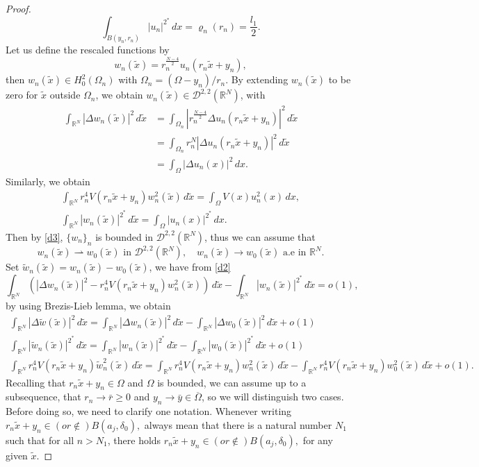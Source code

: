 \documentclass[reqno]{amsart}
\begin{document}
\begin{proof}
 \[
 \int _{B(y_n, r_n)}|u_n|^{2^*}\,dx=\varrho_n(r_n)=\frac{l_1}{2}.
 \]
 Let us define the rescaled functions by
\[
 w_n(\tilde{x})=r_n^{\frac{N-4}{2}}u_n(r_n\tilde{x}+y_n),
\]
then \(w_n(\tilde{x})\in H^2_0(\Omega_n)\) with \(\Omega_n=(\Omega-y_n)/r_n\). By extending \(w_n(\tilde{x})\) to be zero for \(\tilde{x}\) outside \(\Omega_n\), we obtain \(w_n(\tilde{x})\in \mathcal{D}^{2,2}(\mathbb{R}^N)\), with
\begin{align*}
 \int_{\mathbb{R}^N}|\Delta w_n(\tilde{x})|^2\,d\tilde{x}&=\int_{\Omega_{n}}|r_n^{\frac{N-4}{2}}\Delta u_n(r_n\tilde{x}+y_n)|^2\,d\tilde{x}\\
 &=\int_{\Omega_{n}}r_n^N|\Delta u_n(r_n\tilde{x}+y_n)|^2\,d\tilde{x}\\
 &=\int_{\Omega}|\Delta u_n(x)|^2\,dx.
\end{align*}
Similarly, we obtain
\begin{gather*}
\int_{\mathbb{R}^N}r_n^4V(r_n\tilde{x}+y_n)w_n^2(\tilde{x})\,d\tilde{x}
=\int_{\Omega}V(x)u_n^2(x)\,dx, \\
 \int _{\mathbb{R}^N}|w_n(\tilde{x})|^{2^*}\,d\tilde{x}
 = \int_{\Omega}|u_n(x)|^{2^*}\,dx.
\end{gather*}
Then by \eqref{d3}, \(\{w_n\}_n\) is bounded in \(\mathcal{D}^{2,2}(\mathbb{R}^N)\),
thus we can assume that
 \[
 w_n(\tilde{x})\rightharpoonup w_0(\tilde{x}) \text{ in }
  \mathcal{D}^{2,2}(\mathbb{R}^N), \quad
 w_n(\tilde{x})\to w_0(\tilde{x}) \text{ a.e  in } \mathbb{R}^N.
 \]
Set \(\tilde{w}_n(\tilde{x})= w_n(\tilde{x})-w_0(\tilde{x})\), we have
from \eqref{d2}
\begin{equation}\label{d4}
 \int_{\mathbb{R}^N}\left( |\Delta w_n(\tilde{x})|^2
 -r_n^4 V(r_n\tilde{x}+y_n)w_n^2(\tilde{x})\right)\, d\tilde{x}-\int _{\mathbb{R}^N}|w_n(\tilde{x})|^{2^*}\,d\tilde{x}=o(1),
\end{equation}
by using Brezis-Lieb lemma, we obtain
 \begin{gather*}
 \int_{\mathbb{R}^N}|\Delta \tilde{w}(\tilde{x})|^2\,d\tilde{x}=\int_{\mathbb{R}^N}|\Delta w_n(\tilde{x})|^2\,d\tilde{x}-\int_{\mathbb{R}^N}|\Delta w_0(\tilde{x})|^2\,d\tilde{x}+o(1)\\
 \int _{\mathbb{R}^N}|\tilde{w}_n(\tilde{x})|^{2^*}\,d\tilde{x}=\int _{\mathbb{R}^N}|w_n(\tilde{x})|^{2^*}\,d\tilde{x}-\int _{\mathbb{R}^N}|w_0(\tilde{x})|^{2^*}\,d\tilde{x}+o(1)\\
 \int_{\mathbb{R}^N}r_n^4V(r_n\tilde{x}+y_n)\tilde{w}_n^2(\tilde{x})\,d\tilde{x}
 =\int_{\mathbb{R}^N}r_n^4V(r_n\tilde{x}+y_n)w_n^2(\tilde{x})\,d\tilde{x}
  -\int_{\mathbb{R}^N}r_n^4V(r_n\tilde{x}+y_n)w_0^2(\tilde{x})\,d\tilde{x}+o(1).
 \end{gather*}
Recalling that \(r_n\tilde{x}+y_n\in \Omega\) and \(\Omega\) is bounded, we can assume
up to a subsequence, that \(r_n\to \bar{r}\geq 0\) and
\(y_n \to \bar {y}\in \overline{\Omega}\), so we will distinguish two cases. Before
doing so, we need to clarify one notation.
Whenever writing \( r_n\tilde{x}+y_n \in (or \notin) B(a_j, \delta_0), \) always
mean that there is a natural number \(N_1\) such that for all \(n>N_1\),
there holds \( r_n\tilde{x}+y_n \in (or \notin) B(a_j, \delta_0), \) for any given
\(\tilde{x}\).
\smallskip


\end{proof}
\end{document}

